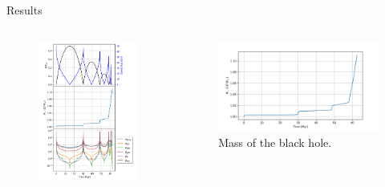 \documentclass{beamer}
\begin{document}
\begin{frame}{Results}
	\begin{columns}
		\begin{column}{0.3\linewidth}
			\begin{figure}[h]
				\centering
				\includegraphics[height=0.7\textheight]{"../Files/Week 6/properties_s02v70"}
			\end{figure}
		\end{column}
		\begin{column}{0.7\linewidth}
			\begin{figure}[h]
				\centering
				\includegraphics[width = \linewidth]{"../Files/Week 6/properties_s02v70_2"}
				\caption{Mass of the black hole.}
			\end{figure}
		\end{column}
	\end{columns}
\end{frame}
\end{document}
